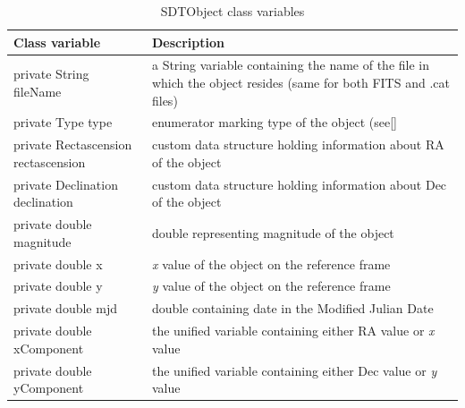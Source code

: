 \begin{table}[H]
\centering
\setlength{\extrarowheight}{2pt}
\begin{tabularx}{\textwidth}{|X|X|}
\hline
\textbf{Class variable} & \textbf{Description} \\ \hline
private String \mbox{fileName} & a String variable containing the name of the file in which the object resides (same for both FITS and .cat files) \\ \hline
private Type \mbox{type} & enumerator marking type of the object (see\ref{} \\ \hline
private \mbox{Rectascension} \mbox{rectascension} & custom data structure holding information about RA of the object \\ \hline
private \mbox{Declination} \mbox{declination} & custom data structure holding information about Dec of the object \\ \hline
private double \mbox{magnitude} & double representing magnitude of the object \\ \hline
private double \mbox{x} & \emph{x} value of the object on the reference frame \\ \hline
private double \mbox{y} & \emph{y} value of the object on the reference frame \\ \hline
private double \mbox{mjd} & double containing date in the Modified Julian Date \\ \hline
private double \mbox{xComponent} & the unified variable containing either RA value or \emph{x} value \\ \hline
private double \mbox{yComponent} & the unified variable containing either Dec value or \emph{y} value \\ \hline
\end{tabularx}
\caption{SDTObject class variables}
\label{tab:class_variables_O}
\end{table}

